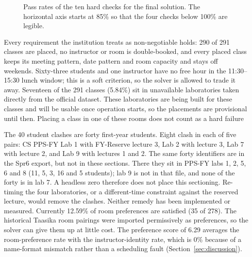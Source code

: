 \documentclass[journal]{IEEEtran}
\begin{document}
\begin{figure}[t]
\centering
{}
\caption{Pass rates of the ten hard checks for the final solution. The horizontal axis starts at 85\% so that the four checks below 100\% are legible.}
\label{fig:hardchecks}
\end{figure}

Every requirement the institution treats as non-negotiable holds: 290 of 291 classes are placed, no instructor or room is double-booked, and every placed class keeps its meeting pattern, date pattern and room capacity and stays off weekends. Sixty-three students and one instructor have no free hour in the 11:30--15:30 lunch window; this is a soft criterion, so the solver is allowed to trade it away. Seventeen of the 291 classes (5.84\%) sit in unavailable laboratories taken directly from the official dataset. These laboratories are being
built for these classes and will be usable once operation starts, so the
placements are provisional until then. Placing a class in one of these rooms
does not count as a hard failure

The 40 student clashes are forty first-year students. Eight clash in each of five pairs: CS PPS-FY Lab 1 with FY-Reserve lecture 3, Lab 2 with lecture 3, Lab 7 with lecture 2, and Lab 9 with lectures 1 and 2. The same forty identifiers are in the Spr6 export, but not in these sections. There they sit in PPS-FY labs 1, 2, 5, 6 and 8 (11, 5, 3, 16 and 5 students); lab 9 is not in that file, and none of the forty is in lab 7. A headless zero therefore does not place this sectioning. Re-timing the four laboratories, or a different-time constraint against the reserved lecture, would remove the clashes. Neither remedy has been implemented or measured. Currently 12.59\% of room preferences are satisfied (35 of 278). The historical Taasika room pairings were imported permissively as preferences, so the solver can give them up at little cost. The preference score of 6.29 averages the room-preference rate with the instructor-identity rate, which is 0\% because of a name-format mismatch rather than a scheduling fault (Section~\ref{sec:discussion}).
\end{document}
